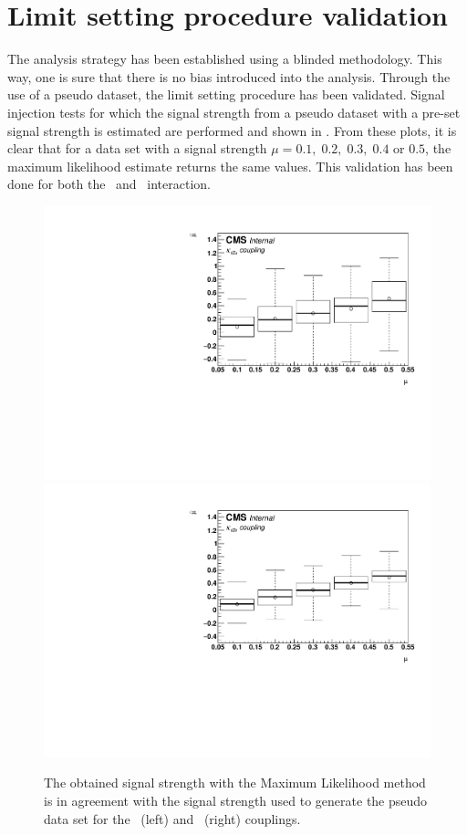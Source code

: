 \section{Limit setting procedure validation}
\label{sec:val}
The analysis strategy has been established using a blinded methodology. This way, one is sure that there is no bias introduced into the analysis. Through the use of a pseudo dataset, the limit setting procedure has been validated. Signal injection tests for which the signal strength from a pseudo dataset with a pre-set  signal strength is estimated are performed and shown in . From these plots, it is clear that for a data set with a signal strength $\mu= 0.1,\;0.2,\;0.3,\;0.4$ or $0.5$, the maximum likelihood estimate returns the same values. This validation has been done for both the \Zut\ and \Zct\ interaction.
\begin{figure}[htbp]
	\centering
	 \includegraphics[width=0.49\linewidth]{6_Search/Figures/SignalInjection/plotZuttrial}
	 \includegraphics[width=0.49\linewidth]{6_Search/Figures/SignalInjection/plotZcttrial}
	\caption{The  obtained signal strength with the Maximum Likelihood method is in agreement with the signal strength used to generate the pseudo data set for the \Zut\ (left) and \Zct\ (right) couplings.}
	\label{fig:plotzut}
\end{figure}

